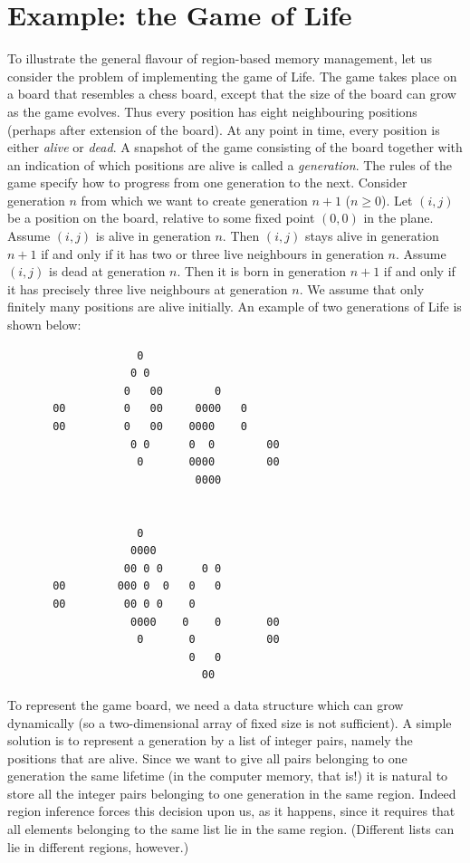 \documentclass[12pt]{book}
\begin{document}
\section{Example: the Game of Life}
\label{life.sec}
To illustrate the general flavour of region-based memory management,
let us consider the problem of implementing the game of Life. The
game takes place on a board that resembles a chess board, except that
the size of the board can grow as the game evolves. Thus every position
has eight neighbouring positions (perhaps after extension of the board). 
At any point in time, every
position is either  {\em alive} or {\em dead}. A snapshot of the game consisting
of the board together with an indication of which positions are alive is called
a {\em generation}. The rules of the game specify how to progress from one
generation to the next. Consider generation $n$ from which we want
to create generation $n+1$ ($n\geq0$). Let $(i,j)$ be a position on
the board, relative to some fixed
point $(0,0)$ in the plane. Assume $(i,j)$ is alive in generation $n$. Then $(i,j)$ stays
alive in generation $n+1$ if and only if it has two or three live neighbours
in generation $n$. Assume $(i,j)$ is dead at generation $n$. Then it
is born in generation $n+1$ if and only if it has precisely three live
neighbours at generation $n$. We assume that only finitely many positions
are alive initially. An example of two generations of Life
is shown below:
\begin{verbatim}
                    0
                   0 0
                  0   00        0
       00         0   00     0000   0
       00         0   00    0000    0
                   0 0      0  0        00
                    0       0000        00
                             0000


                    0
                   0000
                  00 0 0      0 0
       00        000 0  0   0   0
       00         00 0 0    0
                   0000    0    0       00
                    0       0           00
                            0   0
                              00
\end{verbatim}

To represent the game board, we need a data structure 
which can grow dynamically
(so a two-dimensional array of fixed size is not sufficient). 
A simple solution is to represent a generation by a list of integer pairs, namely
the positions that are alive. Since we want to give all pairs belonging
to one generation the same lifetime (in the computer memory, that is!)
it is natural to store all the integer pairs belonging to one generation
in the same region. Indeed region inference forces this decision upon us,
as it happens, since it requires that all elements belonging to the same
list lie in the same region. (Different lists can lie in different regions,
however.)
\end{document}
